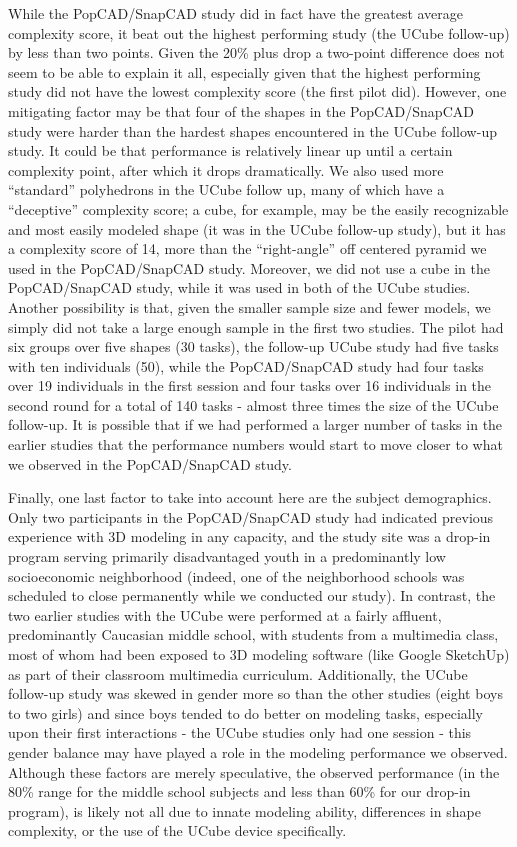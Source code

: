 While the PopCAD/SnapCAD study did in fact have the greatest average complexity
score, it beat out the highest performing study (the UCube follow-up) by less
than two points. Given the 20\% plus drop a two-point difference does not seem
to be able to explain it all, especially given that the highest performing study
did not have the lowest complexity score (the first pilot did). However, one
mitigating factor may be that four of the shapes in the PopCAD/SnapCAD study
were harder than the hardest shapes encountered in the UCube follow-up study. It
could be that performance is relatively linear up until a certain complexity
point, after which it drops dramatically. We also used more ``standard''
polyhedrons in the UCube follow up, many of which have a ``deceptive''
complexity score; a cube, for example, may be the easily recognizable and most
easily modeled shape (it was in the UCube follow-up study), but it has a
complexity score of 14, more than the ``right-angle'' off centered pyramid we
used in the PopCAD/SnapCAD study. Moreover, we did not use a cube in the
PopCAD/SnapCAD study, while it was used in both of the UCube studies. Another
possibility is that, given the smaller sample size and fewer models, we simply
did not take a large enough sample in the first two studies. The pilot had six
groups over five shapes (30 tasks), the follow-up UCube study had five tasks
with ten individuals (50), while the PopCAD/SnapCAD study had four tasks over 19
individuals in the first session and four tasks over 16 individuals in the
second round for a total of 140 tasks - almost three times the size of the UCube
follow-up. It is possible that if we had performed a larger number of tasks in
the earlier studies that the performance numbers would start to move closer to
what we observed in the PopCAD/SnapCAD study.

Finally, one last factor to take into account here are the subject demographics.
Only two participants in the PopCAD/SnapCAD study had indicated previous
experience with 3D modeling in any capacity, and the study site was a drop-in
program serving primarily disadvantaged youth in a predominantly low
socioeconomic neighborhood (indeed, one of the neighborhood schools was
scheduled to close permanently while we conducted our study). In contrast, the
two earlier studies with the UCube were performed at a fairly affluent,
predominantly Caucasian middle school, with students from a multimedia class,
most of whom had been exposed to 3D modeling software (like Google
SketchUp\cite{SketchUp}) as part of their classroom multimedia curriculum.
Additionally, the UCube follow-up study was skewed in gender more so than the
other studies (eight boys to two girls) and since boys tended to do better on
modeling tasks, especially upon their first interactions - the UCube studies
only had one session - this gender balance may have played a role in the
modeling performance we observed. Although these factors are merely speculative,
the observed performance (in the 80\% range for the middle school subjects and
less than 60\% for our drop-in program), is likely not all due to innate
modeling ability, differences in shape complexity, or the use of the UCube
device specifically.

